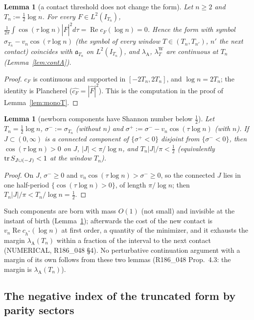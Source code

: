 \documentclass[11pt]{amsart}
\newtheorem{lemma}[theorem]{Lemma}
\theoremstyle{definition}
\theoremstyle{remark}
\newcommand{\Rel}{\operatorname{Re}}
\newcommand{\lamW}{\lambda^{\mathrm W}_T}
\newcommand{\Fh}{\widehat F}
\newcommand{\cF}{c_F}
\begin{document}
\begin{lemma}[a contact threshold does not change the form]\label{lem:wh-birth}
Let $n\ge2$ and $T_n:=\frac12\log n$. For every $F\in L^2(I_{T_n})$, $\frac1{2\pi}\int\cos(\tau\log n)|\Fh|^2d\tau=\Rel\cF(\log n)=0$.
Hence the form with symbol $\sigma_{T_n}-v_n\cos(\tau\log n)$ (the symbol of every window $T\in(T_n,T_{n'})$, $n'$ the next contact)
coincides with $\mathfrak a_{T_n}$ on $L^2(I_{T_n})$, and $\lambda_{\mathrm A}$, $\lamW$ are continuous at $T_n$ (Lemma~\ref{lem:contA}).
\end{lemma}
\begin{proof}
$\cF$ is continuous and supported in $[-2T_n,2T_n]$, and $\log n=2T_n$; the identity is Plancherel
($\widehat{\cF}=|\Fh|^2$). This is the computation in the proof of Lemma~\ref{lem:monoT}.
\end{proof}

\begin{lemma}[newborn components have Shannon number below $\frac12$]\label{lem:wh-shannon}
Let $T_n=\frac12\log n$, $\sigma^-:=\sigma_{T_n}$ (without $n$) and $\sigma^+:=\sigma^--v_n\cos(\tau\log n)$ (with $n$). If $J\subset(0,\infty)$
is a connected component of $\{\sigma^+<0\}$ disjoint from $\{\sigma^-<0\}$, then $\cos(\tau\log n)>0$ on $J$, $|J|<\pi/\log n$, and
$T_n|J|/\pi<\frac12$ (equivalently $\operatorname{tr} S_{J\cup(-J)}<1$ at the window $T_n$).
\end{lemma}
\begin{proof}
On $J$, $\sigma^-\ge0$ and $v_n\cos(\tau\log n)>\sigma^-\ge0$, so the connected $J$ lies in one half-period $\{\cos(\tau\log n)>0\}$,
of length $\pi/\log n$; then $T_n|J|/\pi<T_n/\log n=\frac12$.
\end{proof}
Such components are born with mass $O(1)$ (not small) and invisible at the instant of birth (Lemma~\ref{lem:wh-birth}); afterwards
the cost of the new contact is $v_n\Rel c_{h^*}(\log n)$ at first order, a quantity of the minimizer, and it exhausts the margin
$\lambda_{\mathrm A}(T_n)$ within a fraction of the interval to the next contact (NUMERICAL, R186\_048 \S4). No perturbative
continuation argument with a margin of its own follows from these two lemmas (R186\_048 Prop.~4.3: the margin is $\lambda_{\mathrm A}(T_n)$).

\subsection{The negative index of the truncated form by parity sectors}\label{subsec:wh-index}
\end{document}
